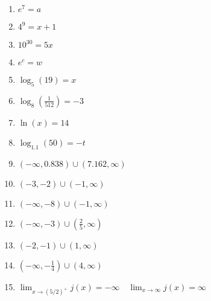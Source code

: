 \begin{enumerate}
	\item $e^7 = a$
    \item $4^9 = x+1$
    \item $10^{30} = 5x$
    \item $e^c = w$
    \item $\log_5(19) = x$
    \item $\log_8\left(\frac{1}{512}\right) = -3$
    \item $\ln(x) = 14$
    \item $\log_{1.1}(50) = -t$

	\item $(-\infty, 0.838) \cup (7.162, \infty)$
    \item $(-3, -2) \cup (-1, \infty)$
    \item $(-\infty, -8) \cup (-1, \infty)$
    \item $(-\infty, -3) \cup \left(\frac{2}{5}, \infty\right)$
    \item $(-2, -1) \cup (1, \infty)$
    \item $\left(-\infty, -\frac{1}{4}\right) \cup (4, \infty)$
    \item $\lim_{x \to (5/2)^+} j(x) = -\infty \quad \lim_{x \to \infty} j(x) = \infty$ 
\end{enumerate}

